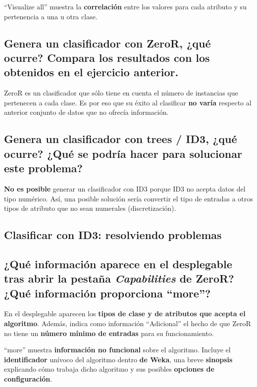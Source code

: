 \documentclass[12pt]{article}
\begin{document}
``Visualize all'' muestra la \textbf{correlación} entre los valores para cada atributo y su pertenencia a una u otra clase.

\subsection*{\small Genera un clasificador con ZeroR, ¿qué ocurre? Compara los resultados con los obtenidos en el ejercicio anterior.}

ZeroR es un clasificador que sólo tiene en cuenta el número de instancias que pertenecen a cada clase. Es por eso que su éxito al clasificar \textbf{no varía} respecto al anterior conjunto de datos que no ofrecía información.

\subsection*{\small Genera un clasificador con trees / ID3, ¿qué ocurre? ¿Qué se podría hacer para solucionar este problema?}

\textbf{No es posible} generar un clasificador con ID3 porque ID3 no acepta datos del tipo numérico. Así, una posible solución sería convertir el tipo de entradas a otros tipos de atributo que no sean numerales (discretización).

\newpage

\begin{center}
\section{Clasificar con ID3: resolviendo problemas}
\end{center}

\subsection*{\small ¿Qué información aparece en el desplegable tras abrir la pestaña \emph{Capabilities} de ZeroR? ¿Qué información proporciona ``more''?}

En el desplegable aparecen los \textbf{tipos de clase y de atributos que acepta el algoritmo}. Además, indica como información ``Adicional'' el hecho de que ZeroR no tiene un \textbf{número mínimo de entradas} para su funcionamiento.

``more'' muestra \textbf{información no funcional} sobre el algoritmo. Incluye el \textbf{identificador} unívoco del algoritmo dentro \textbf{de Weka}, una breve \textbf{sinopsis} explicando cómo trabaja dicho algoritmo y sus posibles \textbf{opciones de configuración}.
\end{document}
